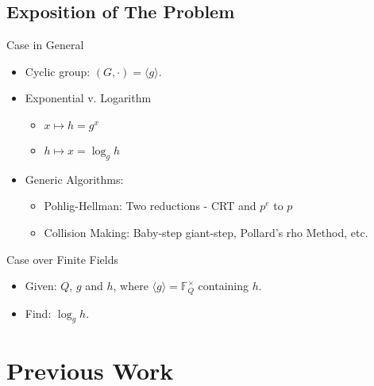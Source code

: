 \documentclass{beamer}
\begin{document}
	\subsection{Exposition of The Problem}
		\begin{frame}{Case in General}
			\begin{itemize}
				\item
					Cyclic group: $(G, \cdot) = \langle g\rangle$.
				\item
					Exponential v. Logarithm
					\begin{itemize}
						\item
							$x \mapsto h = g^x$
						\item
							$h \mapsto x = \log_g{h}$
					\end{itemize}
				\item
					Generic Algorithms:\\
					\begin{itemize}
						\item
							Pohlig-Hellman: Two reductions - CRT and $p^e$ to $p$
						\item
							Collision Making: Baby-step giant-step, Pollard's rho Method, etc.
					\end{itemize}
			\end{itemize}
		\end{frame}
		
		\begin{frame}{Case over Finite Fields}
			\begin{itemize}
				\item
					Given: $Q$, $g$ and $h$, where $\langle g\rangle = \mathbb{F}_Q^\times$ containing $h$.
				\item
					Find: $\log_gh$.
			\end{itemize}
		\end{frame}
\section{Previous Work}
\end{document}
